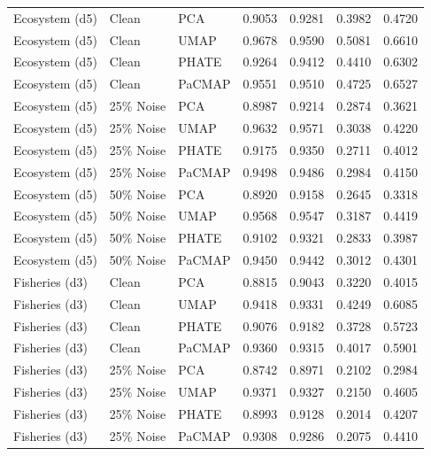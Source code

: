 \begin{table}[t]
\begin{tabular}{lllcccc}
    Ecosystem (d5) & Clean & PCA & 0.9053 & 0.9281 & 0.3982 & 0.4720 \\
    Ecosystem (d5) & Clean & UMAP & 0.9678 & 0.9590 & 0.5081 & 0.6610 \\
    Ecosystem (d5) & Clean & PHATE & 0.9264 & 0.9412 & 0.4410 & 0.6302 \\
    Ecosystem (d5) & Clean & PaCMAP & 0.9551 & 0.9510 & 0.4725 & 0.6527 \\
    
    Ecosystem (d5) & 25\% Noise & PCA & 0.8987 & 0.9214 & 0.2874 & 0.3621 \\
    Ecosystem (d5) & 25\% Noise & UMAP & 0.9632 & 0.9571 & 0.3038 & 0.4220 \\
    Ecosystem (d5) & 25\% Noise & PHATE & 0.9175 & 0.9350 & 0.2711 & 0.4012 \\
    Ecosystem (d5) & 25\% Noise & PaCMAP & 0.9498 & 0.9486 & 0.2984 & 0.4150 \\
    
    Ecosystem (d5) & 50\% Noise & PCA & 0.8920 & 0.9158 & 0.2645 & 0.3318 \\
    Ecosystem (d5) & 50\% Noise & UMAP & 0.9568 & 0.9547 & 0.3187 & 0.4419 \\
    Ecosystem (d5) & 50\% Noise & PHATE & 0.9102 & 0.9321 & 0.2833 & 0.3987 \\
    Ecosystem (d5) & 50\% Noise & PaCMAP & 0.9450 & 0.9442 & 0.3012 & 0.4301 \\
    
    Fisheries (d3) & Clean & PCA & 0.8815 & 0.9043 & 0.3220 & 0.4015 \\
    Fisheries (d3) & Clean & UMAP & 0.9418 & 0.9331 & 0.4249 & 0.6085 \\
    Fisheries (d3) & Clean & PHATE & 0.9076 & 0.9182 & 0.3728 & 0.5723 \\
    Fisheries (d3) & Clean & PaCMAP & 0.9360 & 0.9315 & 0.4017 & 0.5901 \\
    
    Fisheries (d3) & 25\% Noise & PCA & 0.8742 & 0.8971 & 0.2102 & 0.2984 \\
    Fisheries (d3) & 25\% Noise & UMAP & 0.9371 & 0.9327 & 0.2150 & 0.4605 \\
    Fisheries (d3) & 25\% Noise & PHATE & 0.8993 & 0.9128 & 0.2014 & 0.4207 \\
    Fisheries (d3) & 25\% Noise & PaCMAP & 0.9308 & 0.9286 & 0.2075 & 0.4410 \\
    

\end{tabular}
\end{table}
